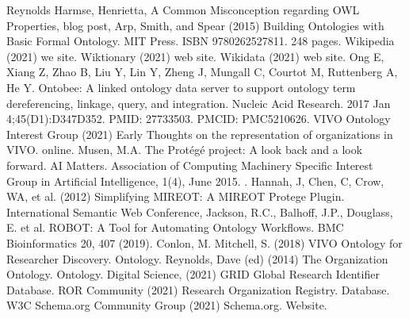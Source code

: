 \documentclass[letterpaper,10pt,english]{sphinxmanual}
\begin{document}
\begin{sphinxthebibliography}{Reynolds}
\sphinxAtStartPar
Harmse, Henrietta, A Common Misconception regarding OWL Properties,
blog post,
\sphinxAtStartPar
Arp, Smith, and Spear (2015) Building Ontologies with Basic Formal Ontology.
MIT Press. ISBN 978\sphinxhyphen{}0262527811.  248 pages.
\sphinxAtStartPar
Wikipedia (2021) we site.  
\sphinxAtStartPar
Wiktionary (2021) web site. 
\sphinxAtStartPar
Wikidata (2021) web site. 
\sphinxAtStartPar
Ong E, Xiang Z, Zhao B, Liu Y, Lin Y, Zheng J, Mungall C, Courtot M,
Ruttenberg A, He Y. Ontobee: A linked ontology data server to support ontology term
dereferencing, linkage, query, and integration. Nucleic Acid Research. 2017
Jan 4;45(D1):D347\sphinxhyphen{}D352. PMID: 27733503. PMCID: PMC5210626.
\sphinxAtStartPar
VIVO Ontology Interest Group (2021) Early Thoughts on the representation
of organizations in VIVO.  on\sphinxhyphen{}line.  
\sphinxAtStartPar
Musen, M.A. The Protégé project: A look back and a look forward. AI
Matters.
Association of Computing Machinery Specific Interest Group in Artificial Intelligence,
1(4), June 2015. .
\sphinxAtStartPar
Hannah, J, Chen, C, Crow, WA, et al. (2012) Simplifying MIREOT: A
MIREOT Protege Plugin. International Semantic Web Conference,
\sphinxAtStartPar
Jackson, R.C., Balhoff, J.P., Douglass, E. et al. ROBOT: A Tool
for Automating Ontology Workflows. BMC Bioinformatics 20, 407 (2019).
\sphinxAtStartPar
Conlon, M. Mitchell, S. (2018) VIVO Ontology for Researcher Discovery.
Ontology.
\sphinxAtStartPar
Reynolds, Dave (ed) (2014) The Organization Ontology.
Ontology.  
\sphinxAtStartPar
Digital Science, (2021) GRID Global Research Identifier Database.
\sphinxAtStartPar
ROR Community (2021) Research Organization Registry. Database.
\sphinxAtStartPar
W3C Schema.org Community Group (2021) Schema.org. Website.
\end{sphinxthebibliography}



\renewcommand{\indexname}{Index}
\printindex
\end{document}
